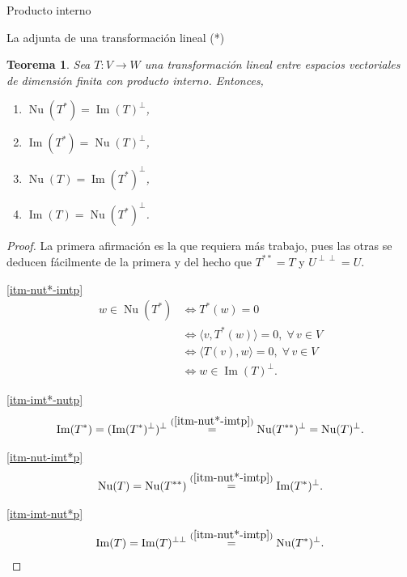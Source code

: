 \documentclass[a4paper,12pt,twoside,spanish,reqno]{amsbook}
\numberwithin{equation}{section}
\newtheorem{teorema}{Teorema}[section]
\theoremstyle{definition}
\theoremstyle{remark}
\newcommand\im{\operatorname{Im}}
\renewcommand\nu{\operatorname{Nu}}
\newcommand{\la}{\langle}
\newcommand{\ra}{\rangle}
\begin{document}
\begin{chapter}{Producto interno}
\begin{section}{La adjunta de una transformación lineal (*)}
        
        \begin{teorema}\label{rel-adj-ort}
            Sea $T: V \to W$ una transformación lineal entre espacios vectoriales de dimensión finita con producto interno. Entonces,
            \begin{enumerate}
                \item\label{itm-nut*-imtp} $\nu(T^*) = \im(T)^\perp$,
                \item\label{itm-imt*-nutp} $\im(T^*) = \nu(T)^\perp$,
                \item\label{itm-nut-imt*p} $\nu(T) = \im(T^*)^\perp$,
                \item\label{itm-imt-nut*p} $\im(T) = \nu(T^*)^\perp$.
            \end{enumerate}
        \end{teorema}
       
        \begin{proof}
            La primera afirmación es la que requiera más trabajo, pues las otras se deducen fácilmente de la primera y del hecho que $T^{**} = T$ y $U^{\perp\perp} = U$. 

          \ref{itm-nut*-imtp}
            \begin{align*}
            w \in  \nu(T^*) &\Leftrightarrow T^*(w) =0 \\&\Leftrightarrow \la v, T^*(w) \ra = 0,\; \forall\, v\in V  \\&\Leftrightarrow \la T(v), w \ra = 0,\; \forall\, v\in V\\&\Leftrightarrow  w \in \im(T)^\perp.
            \end{align*}

           \ref{itm-imt*-nutp}
            \begin{align*}
                \im(T^*) = (\im(T^*)^{\perp})^{\perp} \stackrel{(\ref{itm-nut*-imtp})}{=}    \nu(T^{**})^{\perp} = \nu(T)^{\perp}.
            \end{align*}

          \ref{itm-nut-imt*p}
            \begin{align*}
                \nu(T) = \nu(T^{**}) \stackrel{(\ref{itm-nut*-imtp})}{=}  \im(T^*)^\perp.
            \end{align*}

           \ref{itm-imt-nut*p}
            \begin{align*}
                \im(T) = \im(T)^{\perp\perp}  \stackrel{(\ref{itm-nut*-imtp})}{=}  \nu(T^*)^\perp.
            \end{align*}
        \end{proof}
        

\end{section}
\end{chapter}
\end{document}
